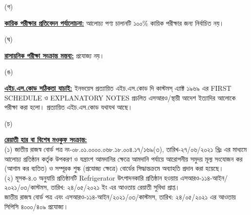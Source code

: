 \documentclass[12pt]{article}
\begin{document}
\begin{minipage}[t]{0.05\linewidth}
(গ)
\end{minipage}
\begin{minipage}[t]{0.90\linewidth}
\underline{\textbf{কায়িক পরীক্ষার প্রতিবেদন পর্যালোচনা:}}
আলোচ্য পণ্য চালানটি ১০০\% কায়িক পরীক্ষার জন্য নির্বাচিত
নয়।
\\
\end{minipage}
\begin{minipage}[t]{0.05\linewidth}
\hspace{1em}
\end{minipage}
\begin{minipage}[t]{0.05\linewidth}
(ঘ)
\end{minipage}
\begin{minipage}[t]{0.90\linewidth}
\underline{\textbf{রাসায়নিক পরীক্ষা সংক্রান্ত মন্তব্য:}}
প্রযোজ্য নয়।
\\
\end{minipage}
\begin{minipage}[t]{0.05\linewidth}
\hspace{1em}
\end{minipage}
\begin{minipage}[t]{0.05\linewidth}
(ঙ)
\end{minipage}
\begin{minipage}[t]{0.90\linewidth}
\underline{\textbf{এইচ.এস.কোড সঠিকতা যাচাই:}}
ইনভয়েস প্রত্যায়িত এইচ.এস.কোড দি কাস্টমস্ এ্যাক্ট ১৯৬৯ এর FIRST SCHEDULE ও
EXPLANATORY NOTES প্রচলিত এসআরও/স্থায়ী আদেশ ইত্যাদির আলোকে পরীক্ষা করা হলো।
প্রত্যায়িত এইচ.এস.কোড যথাযথ আছে।
\\
\end{minipage}
\begin{minipage}[t]{0.05\linewidth}
\hspace{1em}
\end{minipage}
\begin{minipage}[t]{0.05\linewidth}
(চ)
\end{minipage}
\begin{minipage}[t]{0.90\linewidth}
\underline{\textbf{রেয়াতী হার বা বিশেষ মওকুফ সংক্রান্ত:}}
\\
(১) জাতীয় রাজস্ব বোর্ড পত্র নং-০৮.০১.০০০০.০৬৮.১৮.০০৪.১৭/১৬৯(৩),
তারিখ-২৭/০৬/২০২১ খ্রিঃ এর মাধ্যমে আলোচ্য প্রতিষ্ঠান কর্তৃক উপকরণ ও যন্ত্রাংশ
আমদানির ক্ষেত্রে আমদানি পর্যায়ে আরোপনীয় সমুদয় মূল্য সংযোজন কর (আগাম কর ব্যতিত)
ও সম্পূরক শুল্ক (প্রযোজ্য ক্ষেত্রে) বোর্ডের সিদ্ধান্তক্রমে অব্যাহতি প্রদান করা হয়েছে।
\\
(২) মূসক-৪.৩ অনুযায়ি প্রতিষ্ঠানটি Refrigerator উৎপাদনকারি প্রতিষ্ঠান হওয়ায়
এসআরও-১১৪-আইন/২০২১/০৩/কাস্টমস, তারিখ: ২৪/০৫/২০২১ ইং এর
আওতায় রেয়াতী সুবিধা প্রাপ্ত।
\\
জাতীয় রাজস্ব বোর্ড পত্র এবং
এসআরও-১১৪-আইন/২০২১/০৩/কাস্টমস, তারিখ: ২৪/০৫/২০২১
এর আওতায় সিপিসি ৪০০০/৪০৯ প্রযোজ্য।
\\
\end{minipage}
\end{document}
